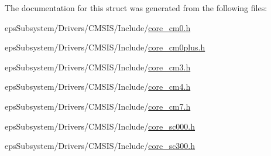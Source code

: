 The documentation for this struct was generated from the following files\-:\begin{DoxyCompactItemize}
\item 
eps\-Subsystem/\-Drivers/\-C\-M\-S\-I\-S/\-Include/\hyperlink{core__cm0_8h}{core\-\_\-cm0.\-h}\item 
eps\-Subsystem/\-Drivers/\-C\-M\-S\-I\-S/\-Include/\hyperlink{core__cm0plus_8h}{core\-\_\-cm0plus.\-h}\item 
eps\-Subsystem/\-Drivers/\-C\-M\-S\-I\-S/\-Include/\hyperlink{core__cm3_8h}{core\-\_\-cm3.\-h}\item 
eps\-Subsystem/\-Drivers/\-C\-M\-S\-I\-S/\-Include/\hyperlink{core__cm4_8h}{core\-\_\-cm4.\-h}\item 
eps\-Subsystem/\-Drivers/\-C\-M\-S\-I\-S/\-Include/\hyperlink{core__cm7_8h}{core\-\_\-cm7.\-h}\item 
eps\-Subsystem/\-Drivers/\-C\-M\-S\-I\-S/\-Include/\hyperlink{core__sc000_8h}{core\-\_\-sc000.\-h}\item 
eps\-Subsystem/\-Drivers/\-C\-M\-S\-I\-S/\-Include/\hyperlink{core__sc300_8h}{core\-\_\-sc300.\-h}\end{DoxyCompactItemize}
